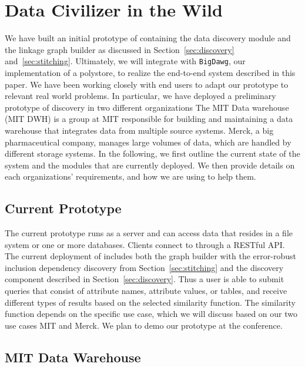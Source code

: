 \section{Data Civilizer in the Wild}
\label{sec:wild}

We have built an initial prototype of \dcv containing the data discovery module
and the linkage graph builder as discussed in Section~\ref{sec:discovery} and~\ref{sec:stitching}. Ultimately, we will integrate \dcv with
\texttt{BigDawg}, our implementation of a polystore, to realize the end-to-end
system described in this paper.  We have been working closely with end users to
adapt our prototype to relevant real world problems.  In particular, we have deployed
a preliminary prototype of discovery in two different organizations The MIT Data
warehouse (MIT DWH) is a group at MIT responsible for building and maintaining a
data warehouse that integrates data from multiple source systems. Merck, a big
pharmaceutical company, manages large volumes of data, which are handled by
different storage systems.  In the following, we first outline the current state
of the system and the modules that are currently deployed.  We then provide
details on each organizations' requirements, and how we are using \dcv to help
them.

\subsection{Current \titledcv Prototype} 

The current prototype runs as a
server and can access data that resides in a file system or one or more
databases.  Clients  connect to \dcv through a RESTful API.  The current
deployment of \dcv  includes both  the graph builder with the error-robust
inclusion dependency discovery from Section~\ref{sec:stitching} and the
discovery component described in Section~\ref{sec:discovery}.  Thus a user is
able to submit queries that consist of attribute names, attribute values, or
tables, and receive different types of results based on the selected
similarity function. The similarity function depends on the specific use case,
which we will discuss based on our two use cases MIT and Merck.  We plan to
demo our \dcv prototype at the conference.

\subsection{MIT Data Warehouse}

